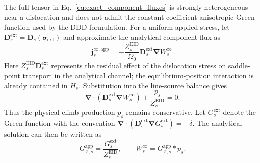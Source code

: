 \documentclass[10pt]{article}
\begin{document}
The full tensor in Eq.~\eqref{eq:exact_component_fluxes} is strongly
heterogeneous near a dislocation and does not admit the constant-coefficient
anisotropic Green function used by the DDD formulation.  For a uniform applied
stress, let
$\bm D_s^{\mathrm{ext}}=\widetilde{\bm D}_s(\bm\sigma_{\mathrm{ext}})$
and approximate the analytical component flux as
\begin{equation}
    \bm j_s^{\infty,\mathrm{app}}
    =
    -\frac{Z_s^{\mathrm{EID}}}{\Omega_0}
    \bm D_s^{\mathrm{ext}}\bm\nabla W_s^\infty.
    \label{eq:biased_analytical_flux}
\end{equation}
Here $Z_s^{\mathrm{EID}}\bm D_s^{\mathrm{ext}}$ represents the residual effect
of the dislocation stress on saddle-point transport in the analytical channel;
the equilibrium-position interaction is already contained in $H_s$.
Substitution into the line-source balance gives
\begin{equation}
    \bm\nabla\cdot
    \left(
    \bm D_s^{\mathrm{ext}}\bm\nabla W_s^\infty
    \right)
    +
    \frac{p_s}{Z_s^{\mathrm{EID}}}
    =0.
    \label{eq:biased_analytical_problem}
\end{equation}
Thus the physical climb production $p_s$ remains conservative.  Let
$G_s^{\mathrm{ext}}$ denote the Green function with the convention
$\bm\nabla\cdot(\bm D_s^{\mathrm{ext}}\bm\nabla
G_s^{\mathrm{ext}})=-\delta$.  The analytical
solution can then be written as
\begin{equation}
    G_{Z,s}^{\mathrm{app}}
    =
    \frac{G_s^{\mathrm{ext}}}{Z_s^{\mathrm{EID}}},
    \qquad
    W_s^\infty
    =
    G_{Z,s}^{\mathrm{app}}*p_s.
    \label{eq:biased_green_approximation}
\end{equation}
\end{document}
